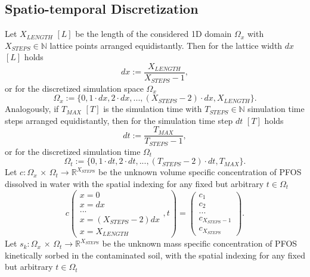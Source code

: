 \subsection{Spatio-temporal Discretization}
Let $X_{LENGTH}$ $[L]$ be the length of the considered 1D domain $\Omega_x$ with $X_{STEPS} \in \mathbb{N}$ lattice points arranged equidistantly. Then for the lattice width $dx$ $[L]$ holds
\begin{equation}
    dx := \frac{X_{LENGTH}}{X_{STEPS} - 1},
    \label{eq:dx}
\end{equation}
or for the discretized simulation space $\Omega_x$
\begin{equation}
    \Omega_x := \{0, 1\cdot dx, 2\cdot dx, ... , (X_{STEPS}-2)\cdot dx, X_{LENGTH}\}.
\end{equation}
Analogously, if $T_{MAX}$ $[T]$ is the simulation time with $T_{STEPS} \in \mathbb{N}$ simulation time steps arranged equidistantly, then for the simulation time step $dt$ $[T]$ holds
\begin{equation}
    dt := \frac{T_{MAX}}{T_{STEPS} - 1},
    \label{eq:dt}
\end{equation}
or for the discretized simulation time $\Omega_t$
\begin{equation}
    \Omega_t := \{0, 1\cdot dt, 2\cdot dt, ... , (T_{STEPS}-2)\cdot dt, T_{MAX}\}.
\end{equation}
Let $c: \Omega_x \, \times \, \Omega_t \rightarrow \mathbb{R}^{X_{STEPS}}$ be the unknown volume specific concentration of PFOS dissolved in water with the spatial indexing for any fixed but arbitrary $t \in \Omega_t$
\begin{equation}
c\left(\begin{array}{l}  x=0\\x=dx\\ ...\\x=(X_{STEPS}-2)dx\\ x=X_{LENGTH} \end{array}, t\right) = \left(\begin{array}{l}  c_1\\c_2\\ ...\\c_{X_{STEPS}-1}\\ c_{X_{STEPS}} \end{array}\right).
\end{equation}
Let $s_k: \Omega_x \, \times \, \Omega_t \rightarrow \mathbb{R}^{X_{STEPS}}$ be the unknown mass specific concentration of PFOS kinetically sorbed in the contaminated soil, with the spatial indexing for any fixed but arbitrary $t \in \Omega_t$
